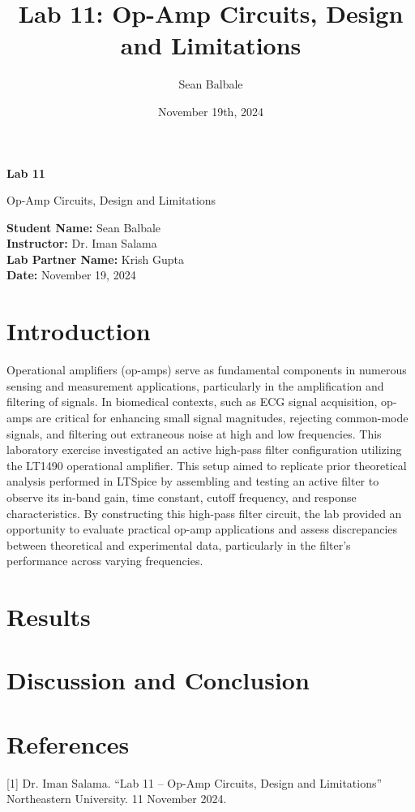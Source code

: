 \documentclass[12pt]{article}
\title{Lab 11: Op-Amp Circuits, Design and Limitations}
\author{Sean Balbale}
\date{November 19th, 2024}
\begin{document}
\begin{titlepage}
  \begin{center}
    \vspace*{1in}

    \Huge
    \textbf{Lab 11}

    \LARGE
    Op-Amp Circuits, Design and Limitations

    \vspace{3 in}

    \textbf{Student Name:} Sean Balbale
    \\ \textbf{Instructor:} Dr. Iman Salama
    \\ \textbf{Lab Partner Name:} Krish Gupta
    \\ \textbf{Date:} November 19, 2024

    \vfill

  \end{center}
\end{titlepage}

\newpage

\section{Introduction}
Operational amplifiers (op-amps) serve as fundamental components in numerous
sensing and measurement applications, particularly in the amplification and
filtering of signals. In biomedical contexts, such as ECG signal acquisition,
op-amps are critical for enhancing small signal magnitudes, rejecting
common-mode signals, and filtering out extraneous noise at high and low
frequencies. This laboratory exercise investigated an active high-pass filter
configuration utilizing the LT1490 operational amplifier. This setup aimed to
replicate prior theoretical analysis performed in LTSpice by assembling and
testing an active filter to observe its in-band gain, time constant, cutoff
frequency, and response characteristics. By constructing this high-pass filter
circuit, the lab provided an opportunity to evaluate practical op-amp
applications and assess discrepancies between theoretical and experimental data,
particularly in the filter's performance across varying frequencies.


\section{Results}


\section{Discussion and Conclusion}


\section{References}
[1] Dr. Iman Salama. “Lab 11 – Op-Amp Circuits, Design and Limitations” Northeastern University. 11 November 2024.
\end{document}
